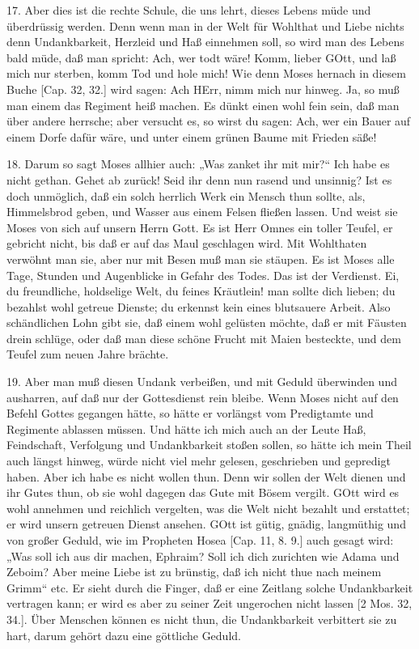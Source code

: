 17. Aber dies ist die rechte Schule, die uns lehrt, dieses Lebens müde und überdrüssig werden. Denn wenn man in der Welt für Wohlthat und Liebe nichts denn Undankbarkeit, Herzleid und Haß einnehmen soll, so wird man des Lebens bald müde, daß man spricht: Ach, wer todt wäre! Komm, lieber GOtt, und laß mich nur sterben, komm Tod und hole mich! Wie denn Moses hernach in diesem Buche [Cap. 32, 32.] wird sagen: Ach HErr, nimm mich nur hinweg. Ja, so muß man einem das Regiment heiß machen. Es dünkt einen wohl fein sein, daß man über andere herrsche; aber versucht es, so wirst du sagen: Ach, wer ein Bauer auf einem Dorfe dafür wäre, und unter einem grünen Baume mit Frieden säße!

18. Darum so sagt Moses allhier auch: „Was zanket ihr mit mir?“ Ich habe es nicht gethan. Gehet ab zurück! Seid ihr denn nun rasend und unsinnig? Ist es doch unmöglich, daß ein solch herrlich Werk ein Mensch thun sollte, als, Himmelsbrod geben, und Wasser aus einem Felsen fließen lassen. Und weist sie Moses von sich auf unsern Herrn Gott. Es ist Herr Omnes ein toller Teufel, er gebricht nicht, bis daß er auf das Maul geschlagen wird. Mit Wohlthaten verwöhnt man sie, aber nur mit Besen muß man sie stäupen. Es ist Moses alle Tage, Stunden und Augenblicke in Gefahr des Todes. Das ist der Verdienst. Ei, du freundliche, holdselige Welt, du feines Kräutlein! man sollte dich lieben; du bezahlst wohl getreue Dienste; du erkennst kein eines blutsauere Arbeit. Also schändlichen Lohn gibt sie, daß einem wohl gelüsten möchte, daß er mit Fäusten drein schlüge, oder daß man diese schöne Frucht mit Maien besteckte, und dem Teufel zum neuen Jahre brächte.

19. Aber man muß diesen Undank verbeißen, und mit Geduld überwinden und ausharren, auf daß nur der Gottesdienst rein bleibe. Wenn Moses nicht auf den Befehl Gottes gegangen hätte, so hätte er vorlängst vom Predigtamte und Regimente ablassen müssen. Und hätte ich
mich auch an der Leute Haß, Feindschaft, Verfolgung und Undankbarkeit stoßen sollen, so hätte ich mein Theil auch längst hinweg, würde nicht viel mehr gelesen, geschrieben und gepredigt haben. Aber ich habe es nicht wollen thun. Denn wir sollen der Welt dienen und ihr Gutes thun, ob sie wohl dagegen das Gute mit Bösem vergilt. GOtt wird es wohl annehmen und reichlich vergelten, was die Welt nicht bezahlt und erstattet; er wird unsern getreuen Dienst ansehen. GOtt ist gütig, gnädig, langmüthig und von großer Geduld, wie im Propheten Hosea [Cap. 11, 8. 9.] auch gesagt wird: „Was soll ich aus dir machen, Ephraim? Soll ich dich zurichten wie Adama und Zeboim? Aber meine Liebe ist zu brünstig, daß ich nicht thue nach meinem Grimm“ etc. Er sieht durch die Finger, daß er eine Zeitlang solche Undankbarkeit vertragen kann; er wird es aber zu seiner Zeit ungerochen nicht lassen [2 Mos. 32, 34.]. Über Menschen können es nicht thun, die Undankbarkeit verbittert sie zu hart, darum gehört dazu eine göttliche Geduld.

